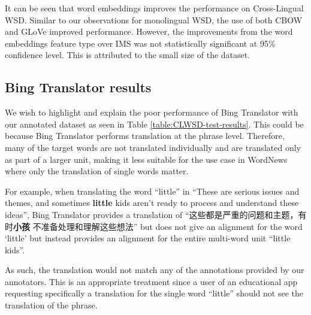 It can be seen that word embeddings improves the performance on Cross-Lingual WSD. Similar to our observations for monolingual WSD, the use of both CBOW and GLoVe improved performance. However, the improvements from the word embeddings feature type over IMS was not statistically significant at 95\% confidence level. This is attributed to the small size of the dataset. 

\subsection{Bing Translator results}
We wish to highlight and explain the poor performance of Bing Translator with our annotated dataset as seen in Table \ref{table:CLWSD-test-results}. This could be because Bing Translator performs translation at the phrase level. Therefore, many of the target words are not translated individually and are translated only as part of a larger unit, making it less suitable for the use case in WordNews where only the translation of single words matter. 
\begin{CJK*}{UTF8}{gbsn}
For example, when translating the word ``little'' in ``These are serious issues and themes, and sometimes {\bf little} kids aren't ready to process and understand these ideas'', Bing Translator provides a translation of ``这些都是严重的问题和主题，有时{\bf 小孩} 不准备处理和理解这些想法'' but does not give an alignment for the word `little' but instead provides an alignment for the entire multi-word unit ``little kids''. 
\end{CJK*}
As such, the translation would not match any of the annotations provided by our annotators. This is an appropriate treatment since a user of an educational app requesting specifically a translation for the single word ``little'' should not see the translation of the phrase.
